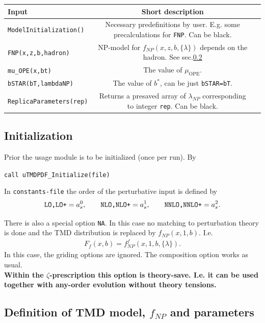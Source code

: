 \documentclass[prd,nofootinbib,eqsecnum,final]{revtex4}
\renewcommand{\(}{\left(}
\renewcommand{\)}{\right)}
\renewcommand{\[}{\left[}
\renewcommand{\]}{\right]}
\newcommand{\blue}[1]{{\color{blue} #1}}
\begin{document}
\begin{center}
\begin{tabular}{||l|c|p{9cm}||}
\hline\hline
Input & Short description
\\\hline
\texttt{ModelInitialization()}  & Necessary predefinitions by user. E.g. some precalculations for \texttt{FNP}. Can be black.
\\\hline
\texttt{FNP(x,z,b,hadron)}  & NP-model for $f_{NP}(x,z,b,\{\lambda\})$ depends on the hadron. See sec.\ref{uTMDPDF:fNP}
\\\hline
\texttt{mu{\_}OPE(x,bt)} & The value of $\mu_{\text{OPE}}$. 
\\\hline
\texttt{bSTAR(bT,lambdaNP)} & The value of $b^*$, can be just \texttt{bSTAR=bT}.
\\\hline
\texttt{ReplicaParameters(rep)} & Returns a presaved array of $\lambda_{NP}$ corresponding to integer \texttt{rep}. Can be black.
\\\hline\hline
\end{tabular}
\end{center}

\subsection{Initialization}
\label{uTMDPDF:init}

Prior the usage module is to be initialized (once per run). By

\texttt{call uTMDPDF{\_}Initialize(file)}

In \texttt{constants-file} the order of the perturbative input is defined by 
$$
\text{\texttt{LO,LO+}}=a_s^0,\qquad
\text{\texttt{NLO,NLO+}}=a_s^1,\qquad
\text{\texttt{NNLO,NNLO+}}=a_s^2.
$$

\begin{tcolorbox}
There is also a special option \texttt{NA}. In this case no matching to perturbation theory is done and the TMD distribution is replaced by $f_{NP}(x,1,b)$. I.e. 
\begin{eqnarray}
F_f(x,b)=f^f_{NP}(x,1,b,\{\lambda\}).
\end{eqnarray}
In this case, the griding options are ignored. The composition option works as usual.
\\
\textbf{\blue{Within the $\zeta$-prescription this option is theory-save. I.e. it can be used together with any-order evolution without theory tensions.}}
\end{tcolorbox}


\subsection{Definition of TMD model, $f_{NP}$ and parameters}
\label{uTMDPDF:fNP}
\end{document}

